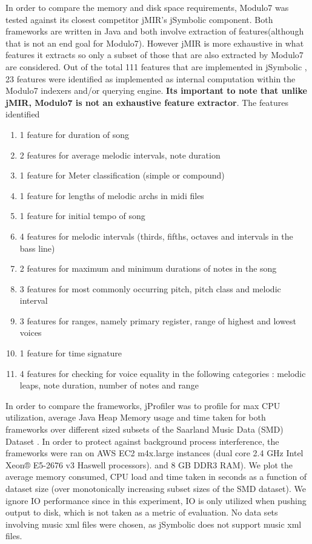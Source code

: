 \noindent In order to compare the memory and disk space requirements, Modulo7 was tested against its closest competitor jMIR's \cite{jMIR} jSymbolic component. Both frameworks are written in Java and both involve extraction of features(although that is not an end goal for Modulo7). However jMIR is more exhaustive in what features it extracts so only a subset of those that are also extracted by Modulo7 are considered. Out of the total 111 features that are implemented in jSymbolic \cite{jSymbolic}, 23 features were identified as implemented as internal computation within the Modulo7 indexers and/or querying engine. \textbf{Its important to note that unlike jMIR, Modulo7 is not an exhaustive feature extractor}. The features identified  
\begin{enumerate}
\item 1 feature for duration of song
\item 2 features for average melodic intervals, note duration
\item 1 feature for Meter classification (simple or compound)
\item 1 feature for lengths of melodic archs in midi files
\item 1 feature for initial tempo of song
\item 4 features for melodic intervals (thirds, fifths, octaves and intervals in the bass line)
\item 2 features for maximum and minimum durations of notes in the song
\item 3 features for most commonly occurring pitch, pitch class and melodic interval
\item 3 features for ranges, namely primary register, range of highest and lowest voices
\item 1 feature for time signature
\item 4 features for checking for voice equality in the following categories : melodic leaps, note duration, number of notes and range
\end{enumerate}
\noindent In order to compare the frameworks, jProfiler was to profile for max CPU utilization, average Java Heap Memory usage and time taken for both frameworks over different sized subsets of the Saarland Music Data (SMD) Dataset \cite{saarlandmsd}. In order to protect against background process interference, the frameworks were ran on AWS EC2 m4x.large instances (dual core 2.4 GHz Intel Xeon® E5-2676 v3 Haswell processors).
and 8 GB DDR3 RAM). We plot the average memory consumed, CPU load and time taken in seconds as a function of dataset size (over monotonically increasing subset sizes of the SMD dataset). We ignore IO performance since in this experiment, IO is only utilized when pushing output to disk, which is not taken as a metric of evaluation. No data sets involving music xml files were chosen, as jSymbolic does not support music xml files. 

